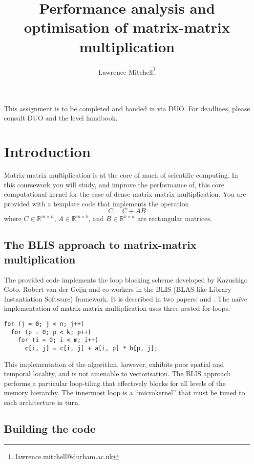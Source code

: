 \documentclass[a4paper]{article}
\title{Performance analysis and optimisation of matrix-matrix multiplication}
\author{Lawrence Mitchell\thanks{lawrence.mitchell@durham.ac.uk}}
\begin{document}
\maketitle

This assignment is to be completed and handed in via DUO. 
For deadlines, please consult DUO and the level handbook.

\section{Introduction}
\label{sec:introduction}
Matrix-matrix multiplication is at the core of much of scientific
computing. In this coursework you will study, and improve the
performance of, this core computational kernel for the case of dense
matrix-matrix multiplication. You are provided with a template code
that implements the operation
\begin{equation}
  \label{eq:1}
  C = C + A B
\end{equation}
where $C \in \mathbb{R}^{m \times n}$, $A \in \mathbb{R}^{m \times k}$,
and $B \in \mathbb{R}^{k \times n}$ are rectangular matrices.

\subsection{The BLIS approach to matrix-matrix multiplication}
\label{sec:blis}

The provided code implements the loop blocking scheme developed by
Kazushigo Goto, Robert van der Geijn and co-workers in the BLIS
(BLAS-like Library Instantiation Software) framework. It is described
in two papers: \textcite{Goto:2008} and \textcite{Zee:2015}. The na{\"i}ve
implementation of matrix-matrix multiplication uses three nested
for-loops.
\begin{verbatim}
for (j = 0; j < n; j++)
  for (p = 0; p < k; p++)
    for (i = 0; i < m; i++)
      c[i, j] = c[i, j] + a[i, p] * b[p, j];
\end{verbatim}
This implementation of the algorithm, however, exhibits poor spatial
and temporal locality, and is not amenable to vectorisation. The BLIS
approach performs a particular loop-tiling that effectively blocks for
all levels of the memory hierarchy. The innermost loop is a
``microkernel'' that must be tuned to each architecture in turn.


\subsection{Building the code}
\label{sec:build}
\end{document}
